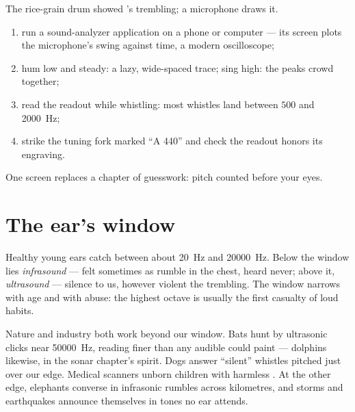 \begin{method}\label{met:g8:sound-pitch-loudness:seeing}
The rice-grain drum showed 's trembling; a microphone
draws it.
\begin{enumerate}
  \item run a sound-analyzer application on a phone or
        computer --- its screen plots the microphone's swing
        against time, a modern oscilloscope;
  \item hum low and steady: a lazy, wide-spaced trace; sing
        high: the peaks crowd together;
  \item read the  readout while whistling: most
        whistles land between $500$ and \qty{2000}{Hz};
  \item strike the tuning fork marked ``A 440'' and check
        the readout honors its engraving.
\end{enumerate}
One screen replaces a chapter of guesswork: pitch counted
before your eyes.
\end{method}

\section{The ear's window}

\begin{proposition}\label{prop:g8:sound-pitch-loudness:range}
Healthy young ears catch  between about
\qty{20}{Hz} and \qty{20000}{Hz}. Below the window lies
\emph{infrasound} --- felt sometimes as
rumble in the chest, heard never; above it,
\emph{ultrasound} --- silence to us,
however violent the trembling. The window narrows with age
and with abuse: the highest octave is usually the first
casualty of loud habits.
\end{proposition}

\begin{example}\label{ex:g8:sound-pitch-loudness:beyond}
Nature and industry both work beyond our window. Bats hunt by
ultrasonic clicks near \qty{50000}{Hz}, reading  finer
than any audible  could paint --- dolphins likewise, in
the sonar chapter's spirit. Dogs answer ``silent'' whistles
pitched just over our edge. Medical scanners  unborn
children with harmless  . At the other edge,
elephants converse in infrasonic rumbles across kilometres,
and storms and earthquakes announce themselves in tones no
ear attends.
\end{example}

